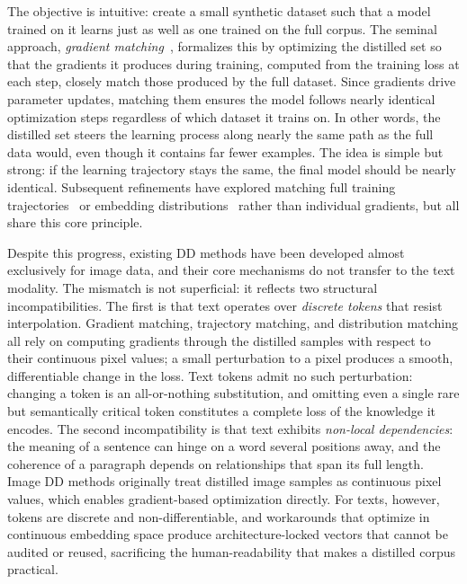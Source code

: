 \documentclass[12pt, a4paper, twoside]{book}
\numberwithin{equation}{chapter}
\theoremstyle{plain}
\theoremstyle{definition}
\theoremstyle{remark}
\newenvironment{foldable}{}{}
\begin{document}
\begin{foldable}
  The objective is intuitive: create a small synthetic dataset such that a model trained on it learns just as well as one trained on the full corpus.
  The seminal approach, \textit{gradient matching}~\cite{wang2018dataset}, formalizes this by optimizing the distilled set so that the gradients it produces during training, computed from the training loss at each step, closely match those produced by the full dataset.
  Since gradients drive parameter updates, matching them ensures the model follows nearly identical optimization steps regardless of which dataset it trains on.
  In other words, the distilled set steers the learning process along nearly the same path as the full data would, even though it contains far fewer examples.
  The idea is simple but strong: if the learning trajectory stays the same, the final model should be nearly identical.
  Subsequent refinements have explored matching full training trajectories~\cite{cazenavette2022dataset} or embedding distributions~\cite{zhao2023dataset} rather than individual gradients, but all share this core principle.
\end{foldable}

\begin{foldable}
  Despite this progress, existing \ac{DD} methods have been developed almost exclusively for image data, and their core mechanisms do not transfer to the text modality.
  The mismatch is not superficial: it reflects two structural incompatibilities.
  The first is that text operates over \textit{discrete tokens} that resist interpolation.
  Gradient matching, trajectory matching, and distribution matching all rely on computing gradients through the distilled samples with respect to their continuous pixel values; a small perturbation to a pixel produces a smooth, differentiable change in the loss.
  Text tokens admit no such perturbation: changing a token is an all-or-nothing substitution, and omitting even a single rare but semantically critical token constitutes a complete loss of the knowledge it encodes.
  The second incompatibility is that text exhibits \textit{non-local dependencies}: the meaning of a sentence can hinge on a word several positions away, and the coherence of a paragraph depends on relationships that span its full length.
  Image \ac{DD} methods originally treat distilled image samples as continuous pixel values, which enables gradient-based optimization directly.
  For texts, however, tokens are discrete and non-differentiable, and workarounds that optimize in continuous embedding space produce architecture-locked vectors that cannot be audited or reused, sacrificing the human-readability that makes a distilled corpus practical.
\end{foldable}
\end{document}
